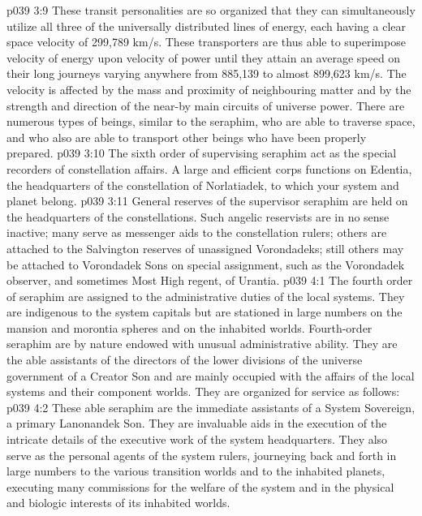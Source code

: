 \vs p039 3:9 These transit personalities are so organized that they can simultaneously utilize all three of the universally distributed lines of energy, each having a clear space velocity of 299,789 km/s. These transporters are thus able to superimpose velocity of energy upon velocity of power until they attain an average speed on their long journeys varying anywhere from 885,139 to almost 899,623 km/s. The velocity is affected by the mass and proximity of neighbouring matter and by the strength and direction of the near\hyp{}by main circuits of universe power. There are numerous types of beings, similar to the seraphim, who are able to traverse space, and who also are able to transport other beings who have been properly prepared.
\vs p039 3:10 \bibnobreakspace {} The sixth order of supervising seraphim act as the special recorders of constellation affairs. A large and efficient corps functions on Edentia, the headquarters of the constellation of Norlatiadek, to which your system and planet belong.
\vs p039 3:11 \bibnobreakspace {} General reserves of the supervisor seraphim are held on the headquarters of the constellations. Such angelic reservists are in no sense inactive; many serve as messenger aids to the constellation rulers; others are attached to the Salvington reserves of unassigned Vorondadeks; still others may be attached to Vorondadek Sons on special assignment, such as the Vorondadek observer, and sometimes Most High regent, of Urantia.
\vs p039 4:1 The fourth order of seraphim are assigned to the administrative duties of the local systems. They are indigenous to the system capitals but are stationed in large numbers on the mansion and morontia spheres and on the inhabited worlds. Fourth\hyp{}order seraphim are by nature endowed with unusual administrative ability. They are the able assistants of the directors of the lower divisions of the universe government of a Creator Son and are mainly occupied with the affairs of the local systems and their component worlds. They are organized for service as follows:
\vs p039 4:2 \bibnobreakspace {} These able seraphim are the immediate assistants of a System Sovereign, a primary Lanonandek Son. They are invaluable aids in the execution of the intricate details of the executive work of the system headquarters. They also serve as the personal agents of the system rulers, journeying back and forth in large numbers to the various transition worlds and to the inhabited planets, executing many commissions for the welfare of the system and in the physical and biologic interests of its inhabited worlds.
